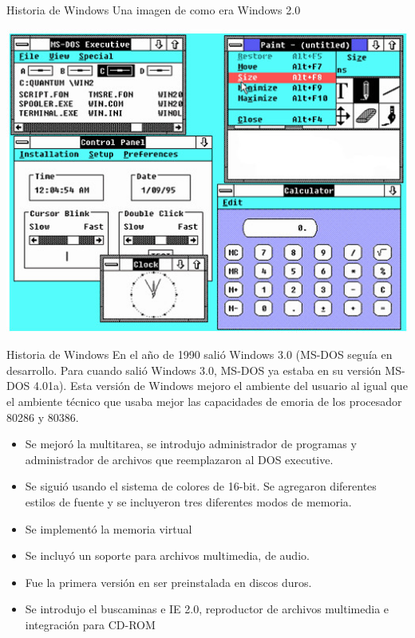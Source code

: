 \documentclass[11pt]{beamer}
\begin{document}
		\begin{frame}{Historia de Windows}
			Una imagen de como era Windows 2.0
			
			\includegraphics[scale=0.6]{w2.jpg}
		\end{frame}
		\begin{frame}{Historia de Windows}
			\small
			En el año de 1990 salió Windows 3.0 (MS-DOS seguía en desarrollo. Para cuando salió Windows 3.0, MS-DOS ya estaba en su versión MS-DOS 4.01a). Esta versión de Windows mejoro el ambiente del usuario al igual que el ambiente técnico que usaba mejor las capacidades de emoria de los procesador 80286 y 80386.
			\begin{itemize}
				\item Se mejoró la multitarea, se introdujo administrador de programas y administrador de archivos que reemplazaron al DOS executive.
				\item Se siguió usando el sistema de colores de 16-bit. Se agregaron diferentes estilos de fuente y se incluyeron tres diferentes modos de memoria.
				\item Se implementó la memoria virtual
				\item Se incluyó un soporte para archivos multimedia, de audio.
				\item Fue la primera versión en ser preinstalada en discos duros.
				\item Se introdujo el buscaminas e IE 2.0, reproductor de archivos multimedia e integración para CD-ROM
			\end{itemize}
		\end{frame}
\end{document}
